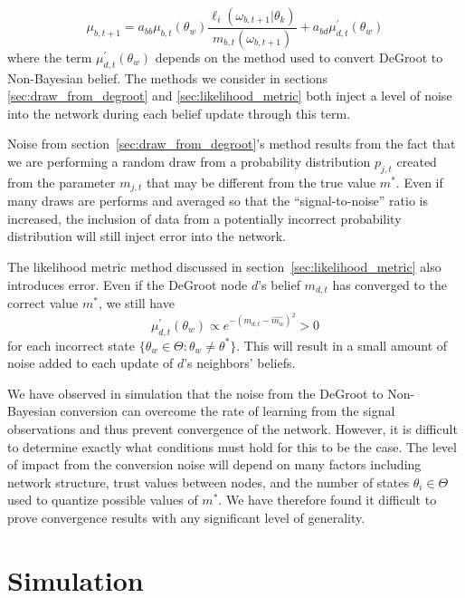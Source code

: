 \documentclass[letterpaper, 11pt, conference]{ieeeconf}
\begin{document}
\begin{equation}
\mu_{b,t+1} = a_{bb}\mu_{b,t}(\theta_w)\frac{\ell_i(\omega_{b,t+1}|\theta_k)}{m_{b,t}(\omega_{b,t+1})} + a_{bd}\mu_{d,t}^\prime(\theta_w)
\end{equation}
where the term $\mu_{d,t}^\prime(\theta_w)$ depends on the method used to convert DeGroot to Non-Bayesian belief.  The methods we consider in sections \ref{sec:draw_from_degroot} and \ref{sec:likelihood_metric} both inject a level of noise into the network during each belief update through this term.

Noise from section~\ref{sec:draw_from_degroot}'s method results from the fact that we are performing a random draw from a probability distribution $p_{j,t}$ created from the parameter $m_{j,t}$ that may be different from the true value $m^*$.  Even if many draws are performs and averaged so that the ``signal-to-noise'' ratio is increased, the inclusion of data from a potentially incorrect probability distribution will still inject error into the network.

The likelihood metric method discussed in section~\ref{sec:likelihood_metric} also introduces error.  Even if the DeGroot node $d$'s belief $m_{d,t}$ has converged to the correct value $m^*$, we still have
\begin{equation}
\mu_{d,t}^\prime(\theta_w) \propto e^{-(m_{d,t} - \hat{m_w})^2} > 0
\end{equation}
for each incorrect state $\{ \theta_w \in \Theta : \theta_w \neq \theta^* \}$.  This will result in a small amount of noise added to each update of $d$'s neighbors' beliefs.

We have observed in simulation that the noise from the DeGroot to Non-Bayesian conversion can overcome the rate of learning from the signal observations and thus prevent convergence of the network.  However, it is difficult to determine exactly what conditions must hold for this to be the case.  The level of impact from the conversion noise will depend on many factors including network structure, trust values between nodes, and the number of states $\theta_i \in \Theta$ used to quantize possible values of $m^*$.  We have therefore found it difficult to prove convergence results with any significant level of generality.

\section{Simulation}
\label{sec:simulation}
\end{document}
